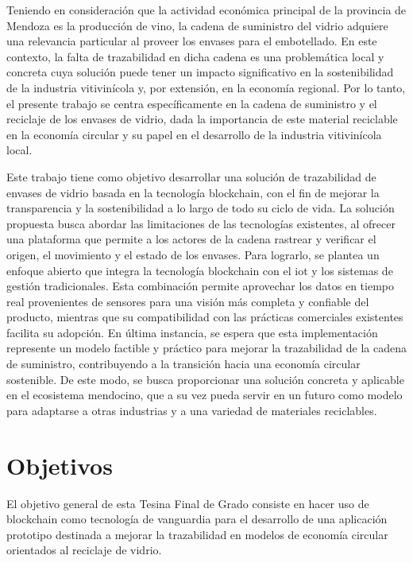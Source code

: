 Teniendo en consideración que la actividad económica principal de la provincia de Mendoza es la producción de vino, la cadena de suministro del vidrio adquiere una relevancia particular al proveer los envases para el embotellado. En este contexto, la falta de trazabilidad en dicha cadena es una problemática local y concreta cuya solución puede tener un impacto significativo en la sostenibilidad de la industria vitivinícola y, por extensión, en la economía regional. Por lo tanto, el presente trabajo se centra específicamente en la cadena de suministro y el reciclaje de los envases de vidrio, dada la importancia de este material reciclable en la economía circular y su papel en el desarrollo de la industria vitivinícola local.

Este trabajo tiene como objetivo desarrollar una solución de trazabilidad de envases de vidrio basada en la tecnología blockchain, con el fin de mejorar la transparencia y la sostenibilidad a lo largo de todo su ciclo de vida. La solución propuesta busca abordar las limitaciones de las tecnologías existentes, al ofrecer una plataforma que permite a los actores de la cadena rastrear y verificar el origen, el movimiento y el estado de los envases. Para lograrlo, se plantea un enfoque abierto que integra la tecnología blockchain con el \acrfull{iot} y los sistemas de gestión tradicionales. Esta combinación permite aprovechar los datos en tiempo real provenientes de sensores para una visión más completa y confiable del producto, mientras que su compatibilidad con las prácticas comerciales existentes facilita su adopción. En última instancia, se espera que esta implementación represente un modelo factible y práctico para mejorar la trazabilidad de la cadena de suministro, contribuyendo a la transición hacia una economía circular sostenible. De este modo, se busca proporcionar una solución concreta y aplicable en el ecosistema mendocino, que a su vez pueda servir en un futuro como modelo para adaptarse a otras industrias y a una variedad de materiales reciclables.

\section{Objetivos}

El objetivo general de esta Tesina Final de Grado consiste en hacer uso de blockchain como tecnología de vanguardia para el desarrollo de una aplicación prototipo destinada a mejorar la trazabilidad en modelos de economía circular orientados al reciclaje de vidrio.

